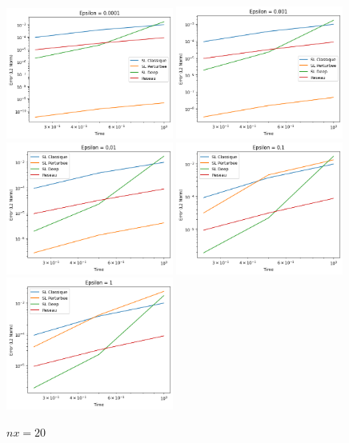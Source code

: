 \documentclass{article}
\begin{document}
\newpage 

\begin{figure}[htbp]
    \centering
    \includegraphics[width=0.49\textwidth]{images/20ep21.png}
    \includegraphics[width=0.49\textwidth]{images/20ep22.png}
    \includegraphics[width=0.49\textwidth]{images/20ep23.png}
    \includegraphics[width=0.49\textwidth]{images/20ep24.png}
    \includegraphics[width=0.49\textwidth]{images/20ep25.png}
    \caption{$nx = 20$}
\end{figure}
\end{document}
